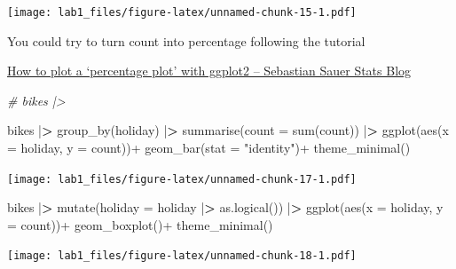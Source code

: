 \documentclass[
]{article}
\newenvironment{Shaded}{\begin{snugshade}}{\end{snugshade}}
\newcommand{\AttributeTok}[1]{\textcolor[rgb]{0.77,0.63,0.00}{#1}}
\newcommand{\CommentTok}[1]{\textcolor[rgb]{0.56,0.35,0.01}{\textit{#1}}}
\newcommand{\ErrorTok}[1]{\textcolor[rgb]{0.64,0.00,0.00}{\textbf{#1}}}
\newcommand{\FunctionTok}[1]{\textcolor[rgb]{0.00,0.00,0.00}{#1}}
\newcommand{\NormalTok}[1]{#1}
\newcommand{\SpecialCharTok}[1]{\textcolor[rgb]{0.00,0.00,0.00}{#1}}
\newcommand{\StringTok}[1]{\textcolor[rgb]{0.31,0.60,0.02}{#1}}
\begin{document}
\texttt{[image: lab1\_files/figure-latex/unnamed-chunk-15-1.pdf]}

You could try to turn count into percentage following the tutorial

\href{https://sebastiansauer.github.io/percentage_plot_ggplot2_V2/}{How
to plot a `percentage plot' with ggplot2 -- Sebastian Sauer Stats Blog}

\begin{Shaded}
\begin{Highlighting}[]
\CommentTok{\# bikes |\textgreater{} }
\end{Highlighting}
\end{Shaded}

\begin{Shaded}
\begin{Highlighting}[]
\NormalTok{bikes }\SpecialCharTok{|}\ErrorTok{\textgreater{}} 
  \FunctionTok{group\_by}\NormalTok{(holiday) }\SpecialCharTok{|}\ErrorTok{\textgreater{}} 
  \FunctionTok{summarise}\NormalTok{(}\AttributeTok{count =} \FunctionTok{sum}\NormalTok{(count)) }\SpecialCharTok{|}\ErrorTok{\textgreater{}} 
    \FunctionTok{ggplot}\NormalTok{(}\FunctionTok{aes}\NormalTok{(}\AttributeTok{x =}\NormalTok{ holiday, }\AttributeTok{y =}\NormalTok{ count))}\SpecialCharTok{+}
    \FunctionTok{geom\_bar}\NormalTok{(}\AttributeTok{stat =} \StringTok{"identity"}\NormalTok{)}\SpecialCharTok{+}
    \FunctionTok{theme\_minimal}\NormalTok{()}
\end{Highlighting}
\end{Shaded}

\texttt{[image: lab1\_files/figure-latex/unnamed-chunk-17-1.pdf]}

\begin{Shaded}
\begin{Highlighting}[]
\NormalTok{bikes }\SpecialCharTok{|}\ErrorTok{\textgreater{}} 
  \FunctionTok{mutate}\NormalTok{(}\AttributeTok{holiday =}\NormalTok{ holiday }\SpecialCharTok{|}\ErrorTok{\textgreater{}} \FunctionTok{as.logical}\NormalTok{()) }\SpecialCharTok{|}\ErrorTok{\textgreater{}} 
    \FunctionTok{ggplot}\NormalTok{(}\FunctionTok{aes}\NormalTok{(}\AttributeTok{x =}\NormalTok{ holiday, }\AttributeTok{y =}\NormalTok{ count))}\SpecialCharTok{+}
    \FunctionTok{geom\_boxplot}\NormalTok{()}\SpecialCharTok{+}
    \FunctionTok{theme\_minimal}\NormalTok{()}
\end{Highlighting}
\end{Shaded}

\texttt{[image: lab1\_files/figure-latex/unnamed-chunk-18-1.pdf]}
\end{document}
